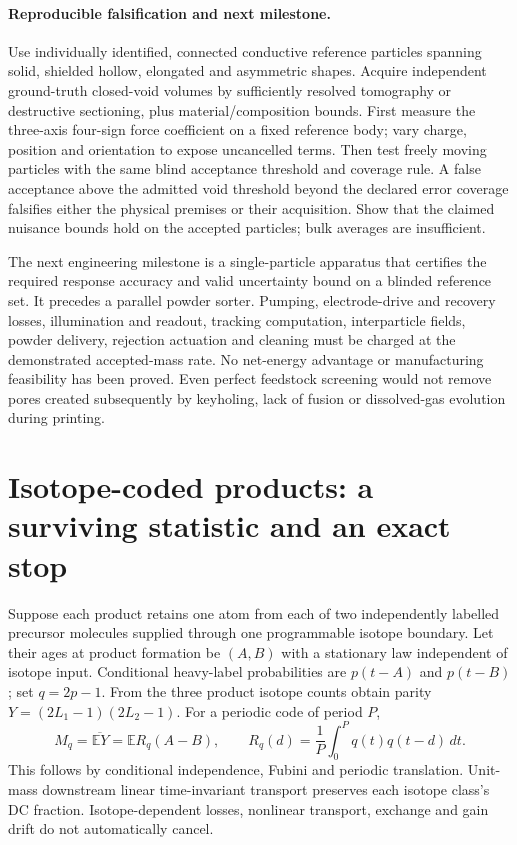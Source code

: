 \documentclass[11pt]{article}
\begin{document}
\paragraph{Reproducible falsification and next milestone.}
Use individually identified, connected conductive reference particles spanning solid, shielded hollow, elongated and asymmetric shapes. Acquire independent ground-truth closed-void volumes by sufficiently resolved tomography or destructive sectioning, plus material/composition bounds. First measure the three-axis four-sign force coefficient on a fixed reference body; vary charge, position and orientation to expose uncancelled terms. Then test freely moving particles with the same blind acceptance threshold and coverage rule. A false acceptance above the admitted void threshold beyond the declared error coverage falsifies either the physical premises or their acquisition. Show that the claimed nuisance bounds hold on the accepted particles; bulk averages are insufficient.

The next engineering milestone is a single-particle apparatus that certifies the required response accuracy and valid uncertainty bound on a blinded reference set. It precedes a parallel powder sorter. Pumping, electrode-drive and recovery losses, illumination and readout, tracking computation, interparticle fields, powder delivery, rejection actuation and cleaning must be charged at the demonstrated accepted-mass rate. No net-energy advantage or manufacturing feasibility has been proved. Even perfect feedstock screening would not remove pores created subsequently by keyholing, lack of fusion or dissolved-gas evolution during printing.

\section{Isotope-coded products: a surviving statistic and an exact stop}\label{sec:isotopecode}

Suppose each product retains one atom from each of two independently labelled precursor molecules supplied through one programmable isotope boundary. Let their ages at product formation be $(A,B)$ with a stationary law independent of isotope input. Conditional heavy-label probabilities are $p(t-A)$ and $p(t-B)$; set $q=2p-1$. From the three product isotope counts obtain parity $Y=(2L_1-1)(2L_2-1)$. For a periodic code of period $P$,
\[
 M_q=\overline{\mathbb E Y}=\mathbb E R_q(A-B),\qquad
 R_q(d)=\frac1P\int_0^Pq(t)q(t-d)\,dt.
 \tag{T11}
\]
This follows by conditional independence, Fubini and periodic translation. Unit-mass downstream linear time-invariant transport preserves each isotope class's DC fraction. Isotope-dependent losses, nonlinear transport, exchange and gain drift do not automatically cancel.
\end{document}
